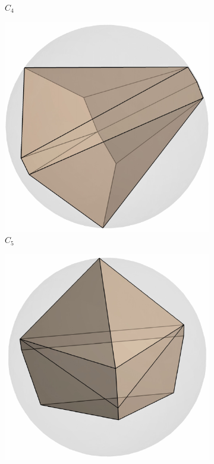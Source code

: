 \documentclass[12pt]{amsart}
\theoremstyle{plain}
\numberwithin{equation}{section}
\begin{document}
\begin{figure}[H]
\begin{subfigure}[b]{0.22\textwidth}
		\caption{$C_4$}
	\end{subfigure}
	\hfill
	\begin{subfigure}[b]{0.22\textwidth}
		\centering
		\includegraphics[scale=0.4]{./figures/small_C5.pdf}
		\caption{$C_5$}
	\end{subfigure}
	\hfill
	\begin{subfigure}[b]{0.22\textwidth}
		\centering
		\includegraphics[scale=0.4]{./figures/small_C6.pdf}

\end{subfigure}
\end{figure}
\end{document}
